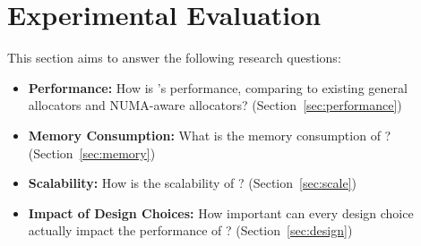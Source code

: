 \section{Experimental Evaluation}
\label{sec:evaluation}

This section aims to answer the following research questions: 

\begin{itemize}
\item \textbf{Performance:} How is \NM{}'s performance, comparing to existing general allocators and NUMA-aware allocators? (Section~\ref{sec:performance}) 
\item \textbf{Memory Consumption:} What is the memory consumption of \NM{}? (Section~\ref{sec:memory})
\item \textbf{Scalability:} How is the scalability of \NM{}? (Section~\ref{sec:scale})
\item \textbf{Impact of Design Choices:} How important can every design choice actually impact the performance of \NM{}? (Section~\ref{sec:design})	
\end{itemize}

